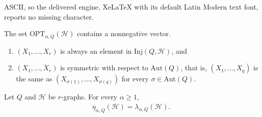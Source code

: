 \documentclass[10pt,a4paper]{amsart}
\begin{document}
ASCII, so the delivered engine, XeLaTeX with its default Latin Modern text font, reports no missing character.
\begin{fact}\label{FACT:nonnegative-optimal-vector}
    The set $\mathrm{OPT}_{\alpha, Q}(\mathcal{H})$ contains a nonnegative vector. 
\end{fact}

\begin{enumerate}[label=(\roman*)]
    \item\label{prop:random-embedding-a} $(X_1, \ldots, X_{r})$ is always an element in $\mathrm{Inj}(Q,\mathcal{H})$, and 
    \item\label{prop:random-embedding-b} $(X_1, \ldots, X_{r})$ is symmetric with respect to $\mathrm{Aut}(Q)$, that is, $(X_1, \ldots, X_{q})$ is the same as $(X_{\sigma(1)}, \ldots, X_{\sigma(q)})$ for every $\sigma \in \mathrm{Aut}(Q)$. 
\end{enumerate}

\begin{proposition}\label{PROP:Lagrangian-Entropy}
    Let $Q$ and $\mathcal{H}$ be $r$-graphs. 
    For every $\alpha \ge 1$, 
    \begin{align*}
        \eta_{\alpha, Q}(\mathcal{H}) = \lambda_{\alpha, Q}(\mathcal{H}).
    \end{align*}
\end{proposition}
\end{document}
